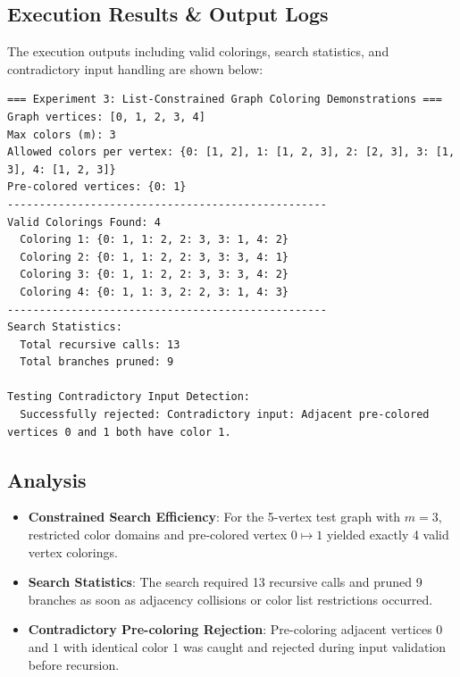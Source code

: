 \documentclass[12pt]{article}
\begin{document}
\subsection{Execution Results \& Output Logs}
The execution outputs including valid colorings, search statistics, and contradictory input handling are shown below:

\begin{lstlisting}[style=output]
=== Experiment 3: List-Constrained Graph Coloring Demonstrations ===
Graph vertices: [0, 1, 2, 3, 4]
Max colors (m): 3
Allowed colors per vertex: {0: [1, 2], 1: [1, 2, 3], 2: [2, 3], 3: [1, 3], 4: [1, 2, 3]}
Pre-colored vertices: {0: 1}
--------------------------------------------------
Valid Colorings Found: 4
  Coloring 1: {0: 1, 1: 2, 2: 3, 3: 1, 4: 2}
  Coloring 2: {0: 1, 1: 2, 2: 3, 3: 3, 4: 1}
  Coloring 3: {0: 1, 1: 2, 2: 3, 3: 3, 4: 2}
  Coloring 4: {0: 1, 1: 3, 2: 2, 3: 1, 4: 3}
--------------------------------------------------
Search Statistics:
  Total recursive calls: 13
  Total branches pruned: 9

Testing Contradictory Input Detection:
  Successfully rejected: Contradictory input: Adjacent pre-colored vertices 0 and 1 both have color 1.

\end{lstlisting}

\subsection{Analysis}
\begin{itemize}
    \item \textbf{Constrained Search Efficiency}: For the 5-vertex test graph with $m=3$, restricted color domains and pre-colored vertex $0 \mapsto 1$ yielded exactly 4 valid vertex colorings.
    \item \textbf{Search Statistics}: The search required 13 recursive calls and pruned 9 branches as soon as adjacency collisions or color list restrictions occurred.
    \item \textbf{Contradictory Pre-coloring Rejection}: Pre-coloring adjacent vertices $0$ and $1$ with identical color $1$ was caught and rejected during input validation before recursion.
\end{itemize}

\end{document}
